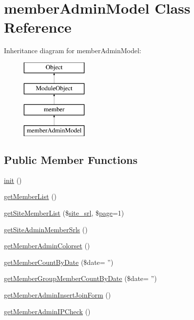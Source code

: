 \hypertarget{classmemberAdminModel}{\section{member\+Admin\+Model Class Reference}
\label{classmemberAdminModel}
}
Inheritance diagram for member\+Admin\+Model\+:\begin{figure}[H]
\begin{center}
\leavevmode
\includegraphics[height=4.000000cm]{classmemberAdminModel}
\end{center}
\end{figure}
\subsection*{Public Member Functions}
\begin{DoxyCompactItemize}
\item 
\hyperlink{classmemberAdminModel_a1d4a66fe65aa6670528bddb2c225b9d7}{init} ()
\item 
\hyperlink{classmemberAdminModel_add5844ac2ed9170897363464c759f94f}{get\+Member\+List} ()
\item 
\hyperlink{classmemberAdminModel_a08479489902bfe0940023bc91ee02184}{get\+Site\+Member\+List} (\$\hyperlink{ko_8install_8php_a8b1406b4ad1048041558dce6bfe89004}{site\+\_\+srl}, \$\hyperlink{classpage}{page}=1)
\item 
\hyperlink{classmemberAdminModel_a2ae855f2db9aa8c5fc821a2de9d766e9}{get\+Site\+Admin\+Member\+Srls} ()
\item 
\hyperlink{classmemberAdminModel_a3f52ba31859fdc224dd0ac50495e450c}{get\+Member\+Admin\+Colorset} ()
\item 
\hyperlink{classmemberAdminModel_ab90b32378d82147e766d6755886b322b}{get\+Member\+Count\+By\+Date} (\$date= '')
\item 
\hyperlink{classmemberAdminModel_a4db855dee9b4624ab0ce224d67ade78e}{get\+Member\+Group\+Member\+Count\+By\+Date} (\$date= '')
\item 
\hyperlink{classmemberAdminModel_a5cd67d34e825a2afa0fb871bd10aadb9}{get\+Member\+Admin\+Insert\+Join\+Form} ()
\item 
\hyperlink{classmemberAdminModel_a26f6b31630804f56a79156f59c0f7603}{get\+Member\+Admin\+I\+P\+Check} ()
\end{DoxyCompactItemize}
